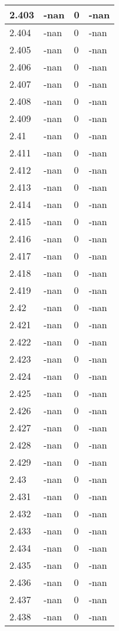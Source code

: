 \documentclass[a4paper,14pt]{extarticle}
\begin{document}
\begin{longtable}{||m{3cm}||m{3cm}|m{3cm}||m{3cm}||}
\hline
2.403 & -nan & 0 & -nan\\
\hline
2.404 & -nan & 0 & -nan\\
\hline
2.405 & -nan & 0 & -nan\\
\hline
2.406 & -nan & 0 & -nan\\
\hline
2.407 & -nan & 0 & -nan\\
\hline
2.408 & -nan & 0 & -nan\\
\hline
2.409 & -nan & 0 & -nan\\
\hline
2.41 & -nan & 0 & -nan\\
\hline
2.411 & -nan & 0 & -nan\\
\hline
2.412 & -nan & 0 & -nan\\
\hline
2.413 & -nan & 0 & -nan\\
\hline
2.414 & -nan & 0 & -nan\\
\hline
2.415 & -nan & 0 & -nan\\
\hline
2.416 & -nan & 0 & -nan\\
\hline
2.417 & -nan & 0 & -nan\\
\hline
2.418 & -nan & 0 & -nan\\
\hline
2.419 & -nan & 0 & -nan\\
\hline
2.42 & -nan & 0 & -nan\\
\hline
2.421 & -nan & 0 & -nan\\
\hline
2.422 & -nan & 0 & -nan\\
\hline
2.423 & -nan & 0 & -nan\\
\hline
2.424 & -nan & 0 & -nan\\
\hline
2.425 & -nan & 0 & -nan\\
\hline
2.426 & -nan & 0 & -nan\\
\hline
2.427 & -nan & 0 & -nan\\
\hline
2.428 & -nan & 0 & -nan\\
\hline
2.429 & -nan & 0 & -nan\\
\hline
2.43 & -nan & 0 & -nan\\
\hline
2.431 & -nan & 0 & -nan\\
\hline
2.432 & -nan & 0 & -nan\\
\hline
2.433 & -nan & 0 & -nan\\
\hline
2.434 & -nan & 0 & -nan\\
\hline
2.435 & -nan & 0 & -nan\\
\hline
2.436 & -nan & 0 & -nan\\
\hline
2.437 & -nan & 0 & -nan\\
\hline
2.438 & -nan & 0 & -nan\\

\end{longtable}
\end{document}
